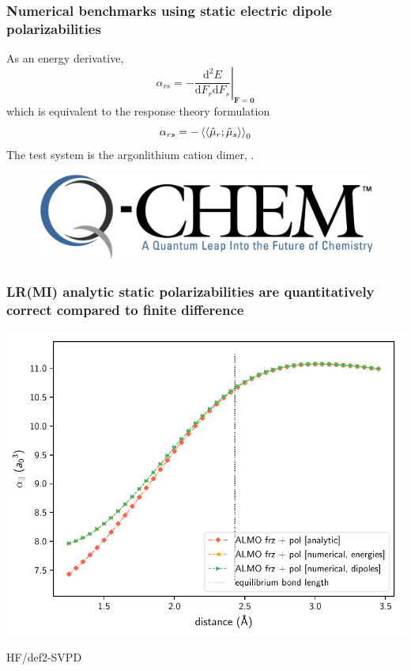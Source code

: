 \documentclass[%
    xcolor=usenames,dvipsnames,svgnames%
]{beamer}
\newcommand{\arlidimer}{\ce{Ar\bond{....}Li+}}
\newenvironment{nscenter}
 {\parskip=0pt\par\nopagebreak\centering}
 {\par\noindent\ignorespacesafterend}
\begin{document}
\begin{frame}
  \frametitle{Numerical benchmarks using static electric dipole polarizabilities}
  As an energy derivative,
  \begin{equation*}
    \alpha_{rs} = - \left. \frac{\text{d}^{2}E}{\text{d}F_{r}\text{d}F_{s}} \right|_{\mathbf{F}=\mathbf{0}}
  \end{equation*}
  which is equivalent to the response theory formulation
  \begin{equation*}
    \alpha_{rs} = - \braket{\braket{\hat{\mu}_{r};\hat{\mu}_{s}}}_{0}
  \end{equation*}
  The test system is the argon\textemdash{}lithium cation dimer, \arlidimer{}.
  \begin{figure}
    \centering
    \includegraphics[scale=0.15]{./figures/Qchem-logo.png}
  \end{figure}
\end{frame}

\begin{frame}
  \frametitle{LR(MI) analytic static polarizabilities are quantitatively correct compared to finite difference}
  \begin{nscenter}
    \includegraphics[scale=0.65]{./figures/almo_analytic_vs_numerical_onaxis_projected_short_def2-SVPD.pdf}
  \end{nscenter}
  {\tiny HF/def2-SVPD}
\end{frame}
\end{document}
